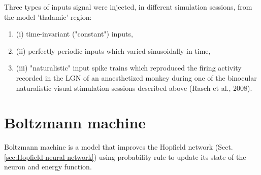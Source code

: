 Three types of inputs signal were injected, in different simulation sessions,
from the model 'thalamic' region: 
\begin{enumerate}
  \item (i) time-invariant ("constant") inputs, 
  
  \item (ii) perfectly periodic inputs which varied sinusoidally in time, 
  
  \item (iii) "naturalistic" input spike trains which reproduced the firing
  activity recorded in the LGN of an anaesthetized monkey during one of the
  binocular naturalistic
visual stimulation sessions described above (Rasch et al., 2008).

\end{enumerate}

\section{Boltzmann machine}
\label{sec:Boltzmann-machine}


Boltzmann machine is a model that improves the Hopfield network
(Sect.\ref{sec:Hopfield-neural-network}) using probability rule to update its
state of the neuron and energy function.


